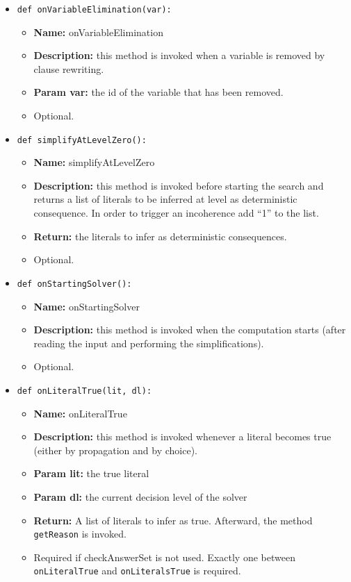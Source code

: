 \documentclass[a4paper,12pt]{article}
\begin{document}
\begin{itemize}
		\item \texttt{def onVariableElimination(var):}
		\begin{itemize}
			\item \textbf{Name:} onVariableElimination
			\item \textbf{Description:} this method is invoked when a variable is removed by clause rewriting.
			\item \textbf{Param var:} the id of the variable that has been removed.
			\item Optional.
		\end{itemize}
		
		\item \texttt{def simplifyAtLevelZero():}
		\begin{itemize}
			\item \textbf{Name:} simplifyAtLevelZero
			\item \textbf{Description:} this method is invoked before starting the search and returns a list of literals to be inferred at level as deterministic consequence. In order to trigger an incoherence add ``1'' to the list.
			\item \textbf{Return:} the literals to infer as deterministic consequences.
			\item Optional.
		\end{itemize}
			
		\item \texttt{def onStartingSolver():}
		\begin{itemize}
			\item \textbf{Name:} onStartingSolver
			\item \textbf{Description:} this method is invoked 	when the computation starts (after reading the input and performing the simplifications).
			\item Optional.
		\end{itemize}			
		
		\item \texttt{def onLiteralTrue(lit, dl):}
		\begin{itemize}
			\item \textbf{Name:} onLiteralTrue
			\item \textbf{Description:} this method is invoked whenever a literal becomes true (either by propagation and by choice).
			\item \textbf{Param lit:} the true literal
			\item \textbf{Param dl:} the current decision level of the solver
			\item \textbf{Return:} A list of literals to infer as true. Afterward, the method \texttt{getReason} is invoked.
			\item Required if checkAnswerSet is not used. Exactly one between \texttt{onLiteralTrue} and \texttt{onLiteralsTrue} is required.
		\end{itemize}


\end{itemize}
\end{document}
